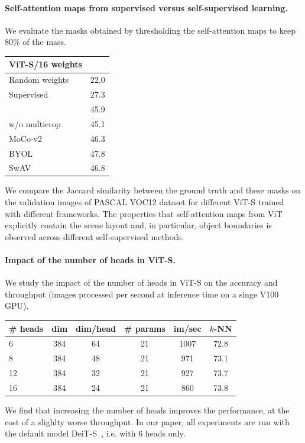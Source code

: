 \paragraph{Self-attention maps from supervised versus self-supervised learning.}
We evaluate the masks obtained by thresholding the self-attention maps to keep 80\% of the mass.
\begin{table}[h!]
\vspace{-0.8em}
  \centering
  \begin{tabular}{@{}l c@{}}
	  \toprule
	  ViT-S/16 weights & \\
	  \midrule
	  Random weights & 22.0 \\
	  Supervised & 27.3 \\
	  \midrule
	  \OURS & 45.9 \\
	  \OURS w/o multicrop & 45.1 \\
	  MoCo-v2 & 46.3 \\
	  BYOL & 47.8 \\
	  SwAV & 46.8 \\
	\bottomrule
  \end{tabular}
\vspace{-0.8em}
\end{table}
We compare the Jaccard similarity between the ground truth and these masks on the validation images of PASCAL VOC12 dataset for different ViT-S trained with different frameworks.
The properties that self-attention maps from ViT explicitly contain the scene layout and, in particular, object boundaries is observed across different self-supervised methods.

\paragraph{Impact of the number of heads in ViT-S.}
We study the impact of the number of heads in ViT-S on the accuracy and throughput (images processed per second at inference time on a singe V100 GPU).
\begin{table}[h!]
\vspace{-0.8em}
  \centering
  \begin{tabular}{@{}l c c c c c@{}}
	  \# heads & dim & dim/head & \# params & im/sec & $k$-NN \\
    \midrule
    \rowcolor{Light}
	  6 & 384 & 64 & 21 & 1007 & 72.8 \\
	  8 & 384 & 48 & 21 & 971 & 73.1 \\
	  12 & 384 & 32 & 21 & 927 & 73.7 \\
	  16 & 384 & 24 & 21 & 860 & 73.8 \\
  \end{tabular}
\vspace{-0.8em}
\end{table}
We find that increasing the number of heads improves the performance, at the cost of a slighlty worse throughput.
In our paper, all experiments are run with the default model DeiT-S~\cite{touvron2020training}, i.e. with $6$ heads only.

